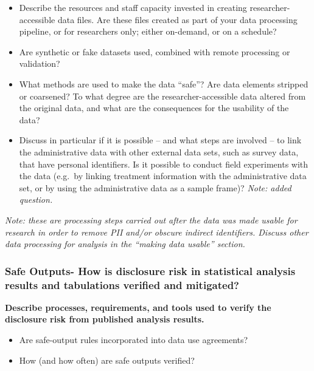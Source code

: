 \documentclass[
]{book}
\providecommand{\tightlist}{%
  \setlength{\itemsep}{0pt}\setlength{\parskip}{0pt}}
\begin{document}
\begin{itemize}
\tightlist
\item
  Describe the resources and staff capacity invested in creating researcher-accessible data files. Are these files created as part of your data processing pipeline, or for researchers only; either on-demand, or on a schedule?
\item
  Are synthetic or fake datasets used, combined with remote processing or validation?
\item
  What methods are used to make the data ``safe''? Are data elements stripped or coarsened? To what degree are the researcher-accessible data altered from the original data, and what are the consequences for the usability of the data?
\item
  Discuss in particular if it is possible -- and what steps are involved -- to link the administrative data with other external data sets, such as survey data, that have personal identifiers. Is it possible to conduct field experiments with the data (e.g.~by linking treatment information with the administrative data set, or by using the administrative data as a sample frame)? \emph{Note: added question.}
\end{itemize}

\emph{Note: these are processing steps carried out after the data was made usable for research in order to remove PII and/or obscure indirect identifiers. Discuss other data processing for analysis in the ``making data usable'' section.}

\hypertarget{safe-outputs--how-is-disclosure-risk-in-statistical-analysis-results-and-tabulations-verified-and-mitigated}{%
\subsubsection*{Safe Outputs- How is disclosure risk in statistical analysis results and tabulations verified and mitigated?}\label{safe-outputs--how-is-disclosure-risk-in-statistical-analysis-results-and-tabulations-verified-and-mitigated}}

\textbf{Describe processes, requirements, and tools used to verify the disclosure risk from published analysis results.}

\begin{itemize}
\tightlist
\item
  Are safe-output rules incorporated into data use agreements?
\item
  How (and how often) are safe outputs verified?
\end{itemize}
\end{document}

